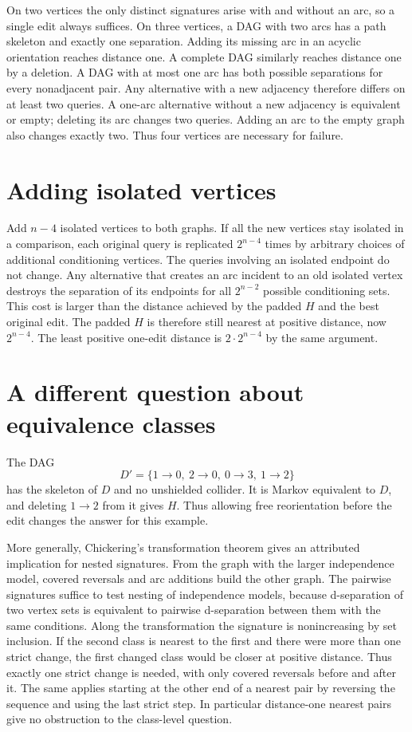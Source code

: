 \documentclass[11pt,a4paper]{amsart}
\begin{document}
On two vertices the only distinct signatures arise with and
without an arc, so a single edit always suffices. On three
vertices, a DAG with two arcs has a path skeleton and exactly
one separation. Adding its missing arc in an acyclic orientation
reaches distance one. A complete DAG similarly reaches distance
one by a deletion. A DAG with at most one arc has both possible
separations for every nonadjacent pair. Any alternative with a
new adjacency therefore differs on at least two queries. A
one-arc alternative without a new adjacency is equivalent or
empty; deleting its arc changes two queries. Adding an arc to
the empty graph also changes exactly two. Thus four vertices
are necessary for failure.

\section{Adding isolated vertices}

Add \(n-4\) isolated vertices to both graphs. If all the new
vertices stay isolated in a comparison, each original query
is replicated \(2^{n-4}\) times by arbitrary choices of
additional conditioning vertices. The queries involving an
isolated endpoint do not change. Any alternative that creates
an arc incident to an old isolated vertex destroys the
separation of its endpoints for all \(2^{n-2}\) possible
conditioning sets. This cost is larger than the distance
achieved by the padded \(H\) and the best original edit.
The padded \(H\) is therefore still nearest at positive
distance, now \(2^{n-4}\). The least positive one-edit
distance is \(2\cdot2^{n-4}\) by the same argument.

\section{A different question about equivalence classes}

The DAG
\[
 D'=\{1\to0,\ 2\to0,\ 0\to3,\ 1\to2\}
\]
has the skeleton of \(D\) and no unshielded collider. It is
Markov equivalent to \(D\), and deleting \(1\to2\) from it
gives \(H\). Thus allowing free reorientation before the
edit changes the answer for this example.

More generally, Chickering's transformation theorem
\cite[Thm.~4]{chick02} gives an attributed implication for nested
signatures. From the graph with the larger independence model,
covered reversals and arc additions build the other graph.
The pairwise signatures suffice to test nesting of independence
models, because d-separation of two vertex sets is equivalent
to pairwise d-separation between them with the same conditions.
Along the transformation the signature is nonincreasing by
set inclusion. If the second class is nearest to the first
and there were more than one strict change, the first changed
class would be closer at positive distance. Thus exactly one
strict change is needed, with only covered reversals before
and after it. The same applies starting at the other end of
a nearest pair by reversing the sequence and using the last
strict step. In particular distance-one nearest pairs give no
obstruction to the class-level question.
\end{document}
